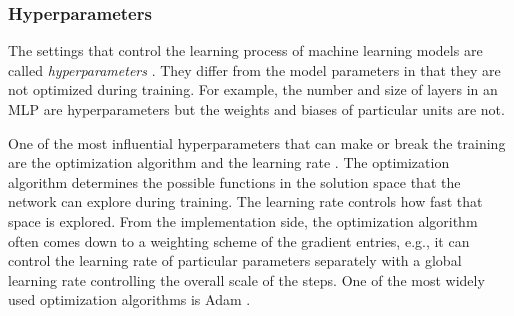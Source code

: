 



\subsubsection{Hyperparameters}

The settings that control the learning process of machine learning models are called \emph{hyperparameters} \cite{Goodfellow-et-al-2016}. They differ from the model parameters in that they are not optimized during training. For example, the number and size of layers in an \ac{MLP} are hyperparameters but the weights and biases of particular units are not.

One of the most influential hyperparameters that can make or break the training are the optimization algorithm and the learning rate \cite{Goodfellow-et-al-2016,Bengio2012}. The optimization algorithm determines the possible functions in the solution space that the network can explore during training. The learning rate controls how fast that space is explored. From the implementation side, the optimization algorithm often comes down to a weighting scheme of the gradient entries, e.g., it can control the learning rate of particular parameters separately with a global learning rate controlling the overall scale of the steps. One of the most widely used optimization algorithms is Adam \cite{Kingma2017}.

